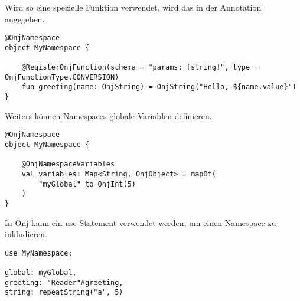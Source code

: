 Wird so eine spezielle Funktion verwendet, wird das in der  Annotation angegeben.

\begin{verbatim}
@OnjNamespace
object MyNamespace {

    @RegisterOnjFunction(schema = "params: [string]", type = OnjFunctionType.CONVERSION)
    fun greeting(name: OnjString) = OnjString("Hello, ${name.value}")
}
\end{verbatim}

Weiters können Namespaces globale Variablen definieren.

\begin{verbatim}
@OnjNamespace
object MyNamespace {

    @OnjNamespaceVariables
    val variables: Map<String, OnjObject> = mapOf(
        "myGlobal" to OnjInt(5)
    )
}
\end{verbatim}

In Onj kann ein use-Statement verwendet werden, um einen Namespace zu inkludieren.

\begin{verbatim}
use MyNamespace;

global: myGlobal,
greeting: "Reader"#greeting,
string: repeatString("a", 5)
\end{verbatim}

\renewcommand{\kapitelautor}{}
